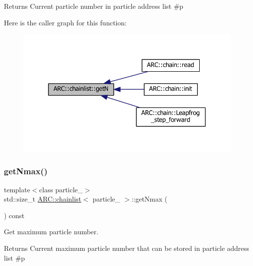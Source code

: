 \begin{DoxyReturn}{Returns}
Current particle number in particle address list \#p 
\end{DoxyReturn}
Here is the caller graph for this function\+:
\nopagebreak
\begin{figure}[H]
\begin{center}
\leavevmode
\includegraphics[width=330pt]{classARC_1_1chainlist_a4292d4468e5d710392f11cee0c1f01b9_icgraph}
\end{center}
\end{figure}
\hypertarget{classARC_1_1chainlist_a582f94629e7433bab30f7ab5e4ef588f}{}\label{classARC_1_1chainlist_a582f94629e7433bab30f7ab5e4ef588f} 
\subsubsection{\texorpdfstring{get\+Nmax()}{getNmax()}}
{\footnotesize\ttfamily template$<$class particle\+\_\+$>$ \\
std\+::size\+\_\+t \hyperlink{classARC_1_1chainlist}{A\+R\+C\+::chainlist}$<$ particle\+\_\+ $>$\+::get\+Nmax (\begin{DoxyParamCaption}{ }\end{DoxyParamCaption}) const\hspace{0.3cm}{\ttfamily [inline]}}



Get maximum particle number. 

\begin{DoxyReturn}{Returns}
Current maximum particle number that can be stored in particle address list \#p 
\end{DoxyReturn}
\hypertarget{classARC_1_1chainlist_a0e2f35b8eabe9d9ecd77ed9f24e083de}{}\label{classARC_1_1chainlist_a0e2f35b8eabe9d9ecd77ed9f24e083de} 
